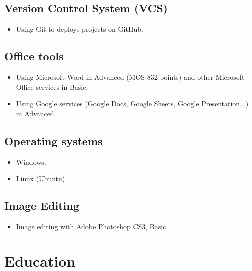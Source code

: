\documentclass{article}
\begin{document}
        \subsection{Version Control System (VCS)}
            \begin{itemize}
                \item Using Git to deploys projects on GitHub.
            \end{itemize}

        \subsection{Office tools}
            \begin{itemize}
                \item Using Microsoft Word in Advanced (MOS 832 points) and other Microsoft Office services in Basic.
                \item Using Google services (Google Docs, Google Sheets, Google Presentation,..) in Advanced.
            \end{itemize}

        \subsection{Operating systems}
            \begin{itemize}
                \item Windows.
                \item Linux (Ubuntu).
            \end{itemize}

        \subsection{Image Editing}
            \begin{itemize}
                \item Image editing with Adobe Photoshop CS3, Basic.
            \end{itemize}

    \section{Education}
\end{document}
